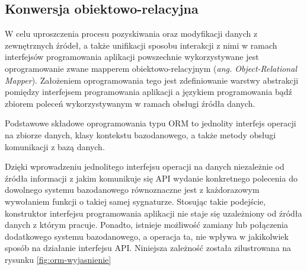 \subsection*{Konwersja obiektowo-relacyjna}
W celu uproszczenia procesu pozyskiwania oraz modyfikacji danych z zewnętrznych źródeł, a także unifikacji sposobu interakcji z nimi w ramach interfejsów programowania aplikacji powszechnie wykorzystywane jest oprogramowanie zwane mapperem obiektowo-relacyjnym (\textit{ang. Object-Relational Mapper}). Założeniem oprogramowania tego jest zdefiniowanie warstwy abstrakcji pomiędzy interfejsem programowania aplikacji a językiem programowania bądź zbiorem poleceń wykorzystywanym w ramach obsługi źródła danych.

Podstawowe składowe oprogramowania typu ORM to jednolity interfejs operacji na zbiorze danych, klasy kontekstu bazodanowego, a także metody obsługi komunikacji z bazą danych.

Dzięki wprowadzeniu jednolitego interfejsu operacji na danych niezależnie od źródła informacji z jakim komunikuje się API wydanie konkretnego polecenia do dowolnego systemu bazodanowego równoznaczne jest z każdorazowym wywołaniem funkcji o takiej samej sygnaturze. Stosując takie podejście, konstruktor interfejsu programowania aplikacji nie staje się uzależniony od źródła danych z którym pracuje. Ponadto, istnieje możliwość zamiany lub połączenia dodatkowego systemu bazodanowego, a operacja ta, nie wpływa w jakikolwiek sposób na działanie interfejsu API. Niniejsza zależność została zilustrowana na rysunku \ref{fig:orm-wyjasnienie}

